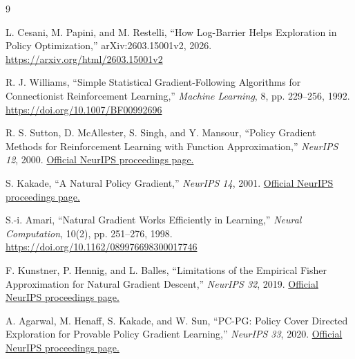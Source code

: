 \documentclass[10pt,a4paper]{article}
\begin{document}
\begin{sloppypar}
\begin{thebibliography}{9}

L. Cesani, M. Papini, and M. Restelli,
``How Log-Barrier Helps Exploration in Policy Optimization,''
arXiv:2603.15001v2, 2026.
\url{https://arxiv.org/html/2603.15001v2}

R. J. Williams,
``Simple Statistical Gradient-Following Algorithms for Connectionist
Reinforcement Learning,''
\emph{Machine Learning}, 8, pp. 229--256, 1992.
\url{https://doi.org/10.1007/BF00992696}

R. S. Sutton, D. McAllester, S. Singh, and Y. Mansour,
``Policy Gradient Methods for Reinforcement Learning with Function
Approximation,'' \emph{NeurIPS 12}, 2000.
\href{https://papers.nips.cc/paper/1999/hash/464d828b85b0bed98e80ade0a5c43b0f-Abstract.html}{Official NeurIPS proceedings page.}

S. Kakade,
``A Natural Policy Gradient,'' \emph{NeurIPS 14}, 2001.
\href{https://papers.nips.cc/paper/2001/hash/4b86abe48d358ecf194c56c69108433e-Abstract.html}{Official NeurIPS proceedings page.}

S.-i. Amari,
``Natural Gradient Works Efficiently in Learning,''
\emph{Neural Computation}, 10(2), pp. 251--276, 1998.
\url{https://doi.org/10.1162/089976698300017746}

F. Kunstner, P. Hennig, and L. Balles,
``Limitations of the Empirical Fisher Approximation for Natural Gradient
Descent,'' \emph{NeurIPS 32}, 2019.
\href{https://proceedings.neurips.cc/paper/2019/hash/46a558d97954d0692411c861cf78ef79-Abstract.html}{Official NeurIPS proceedings page.}

A. Agarwal, M. Henaff, S. Kakade, and W. Sun,
``PC-PG: Policy Cover Directed Exploration for Provable Policy Gradient
Learning,'' \emph{NeurIPS 33}, 2020.
\href{https://papers.nips.cc/paper/2020/hash/9b3a9fb4db30fc6594ec3990cbc09932-Abstract.html}{Official NeurIPS proceedings page.}

\end{thebibliography}
\end{sloppypar}
\end{document}
